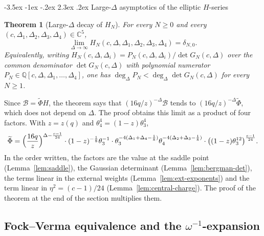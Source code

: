\documentclass[twoside,10pt]{article}
\makeatletter
\numberwithin{equation}{section}
\theoremstyle{slbody}
\newtheorem{theorem}{Theorem}[section]
\theoremstyle{definition}
\theoremstyle{remark}
\renewcommand{\section}{%
  \@startsection{section}{1}{\z@}%
    {-3.5ex \@plus -1ex \@minus -.2ex}%
    {2.3ex \@plus .2ex}%
    {\normalfont\large\bfseries}}
\makeatother
\begin{document}
\section{Large-\texorpdfstring{\(\Delta\)}{Delta} asymptotics of the elliptic \texorpdfstring{\(H\)}{H}-series}\label{sec:asymp}

\begin{theorem}[Large-\(\Delta\) decay of \(H_N\)]\label{thm:large-delta}
For every \(N\geq0\) and every \((c,\Delta_1,\Delta_2,\Delta_3,\Delta_4)\in\mathbb C^5\),
\[
 \lim_{\Delta\to\infty}H_N(c,\Delta,\Delta_1,\Delta_2,\Delta_3,\Delta_4)=\delta_{N,0}.
\]
Equivalently, writing \(H_N(c,\Delta,\Delta_i)=P_N(c,\Delta,\Delta_i)/\det G_N(c,\Delta)\)
over the common denominator \(\det G_N(c,\Delta)\) with polynomial numerator
\(P_N\in\mathbb Q[c,\Delta,\Delta_1,\dots,\Delta_4]\), one has
\(\deg_\Delta P_N<\deg_\Delta\det G_N(c,\Delta)\) for every \(N\geq1\).
\end{theorem}

Since \(\mathcal B=\widetilde\Phi H\), the theorem says that
\((16q/z)^{-\Delta}\mathcal B\) tends to \((16q/z)^{-\Delta}\widetilde\Phi\),
which does not depend on \(\Delta\).  The proof obtains this limit as a product
of four factors.  With \(z=z(q)\) and \(\theta_4^4=(1-z)\theta_3^4\),
\[
 \widetilde\Phi
 =\Bigl(\frac{16q}{z}\Bigr)^{\Delta-\frac{c-1}{24}}
  \cdot(1-z)^{-\frac18}\theta_3^{-1}
  \cdot\theta_3^{-4(\Delta_1+\Delta_4-\frac18)}\theta_4^{-4(\Delta_2+\Delta_3-\frac18)}
  \cdot\bigl((1-z)\theta_3^{12}\bigr)^{\frac{c-1}{24}}.
\]
In the order written, the factors are the value at the saddle point
(Lemma~\ref{lem:saddle}), the Gaussian determinant
(Lemma~\ref{lem:bergman-det}), the terms linear in the external weights
(Lemma~\ref{lem:ext-exponents}) and the term linear in
\(\eta^2=(c-1)/24\) (Lemma~\ref{lem:central-charge}).  The proof of the
theorem at the end of the section multiplies them.

\subsection{Fock--Verma equivalence and the \texorpdfstring{\(\omega^{-1}\)}{1/omega}-expansion}
\end{document}
